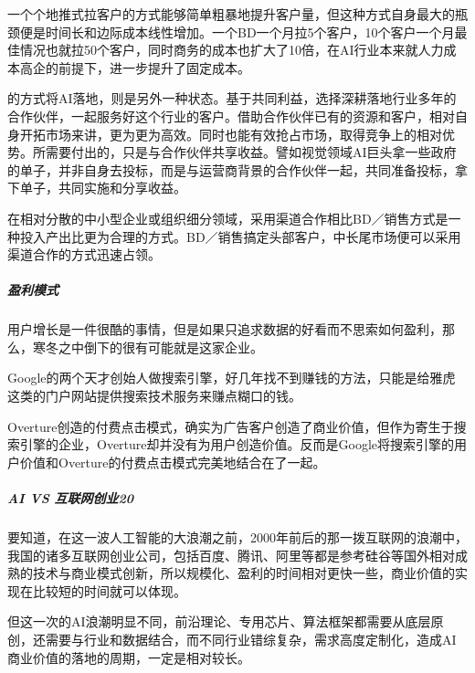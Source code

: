 \documentclass[letterpaper,11pt,english]{sphinxmanual}
\begin{document}
一个个地推式拉客户的方式能够简单粗暴地提升客户量，但这种方式自身最大的瓶颈便是时间长和边际成本线性增加。一个BD一个月拉5个客户，10个客户一个月最佳情况也就拉50个客户，同时商务的成本也扩大了10倍，在AI行业本来就人力成本高企的前提下，进一步提升了固定成本。

的方式将AI落地，则是另外一种状态。基于共同利益，选择深耕落地行业多年的合作伙伴，一起服务好这个行业的客户。借助合作伙伴已有的资源和客户，相对自身开拓市场来讲，更为更为高效。同时也能有效抢占市场，取得竞争上的相对优势。所需要付出的，只是与合作伙伴共享收益。譬如视觉领域AI巨头拿一些政府的单子，并非自身去投标，而是与运营商背景的合作伙伴一起，共同准备投标，拿下单子，共同实施和分享收益。

在相对分散的中小型企业或组织细分领域，采用渠道合作相比BD／销售方式是一种投入产出比更为合理的方式。BD／销售搞定头部客户，中长尾市场便可以采用渠道合作的方式迅速占领。%
\begin{footnote}[338]\sphinxAtStartFootnote
{}
%
\end{footnote}


\subparagraph{盈利模式}
\label{\detokenize{chapter_idea/business:id12}}
用户增长是一件很酷的事情，但是如果只追求数据的好看而不思索如何盈利，那么，寒冬之中倒下的很有可能就是这家企业。

Google的两个天才创始人做搜索引擎，好几年找不到赚钱的方法，只能是给雅虎这类的门户网站提供搜索技术服务来赚点糊口的钱。

Overture创造的付费点击模式，确实为广告客户创造了商业价值，但作为寄生于搜索引擎的企业，Overture却并没有为用户创造价值。反而是Google将搜索引擎的用户价值和Overture的付费点击模式完美地结合在了一起。


\subparagraph{AI VS 互联网创业20\sphinxfootnotemark[339]}
\label{\detokenize{chapter_idea/business:ai-vs-20}}%
\begin{footnotetext}[339]\sphinxAtStartFootnote
{}
%
\end{footnotetext}\ignorespaces 
要知道，在这一波人工智能的大浪潮之前，2000年前后的那一拨互联网的浪潮中，我国的诸多互联网创业公司，包括百度、腾讯、阿里等都是参考硅谷等国外相对成熟的技术与商业模式创新，所以规模化、盈利的时间相对更快一些，商业价值的实现在比较短的时间就可以体现。

但这一次的AI浪潮明显不同，前沿理论、专用芯片、算法框架都需要从底层原创，还需要与行业和数据结合，而不同行业错综复杂，需求高度定制化，造成AI商业价值的落地的周期，一定是相对较长。
\end{document}
